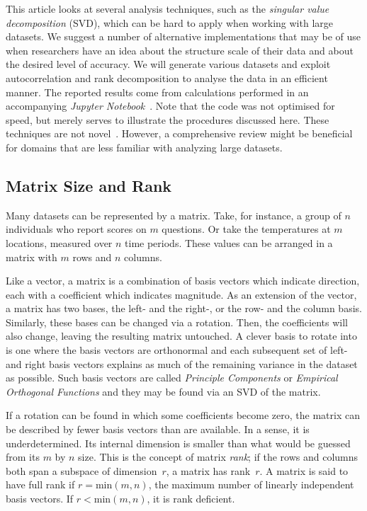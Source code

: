 \documentclass[ijgi,article,submit,moreauthors,pdftex,10pt,a4paper]{Definitions/mdpi}
\begin{document}
This article looks at several analysis techniques, such as the \textit{singular value decomposition} (SVD), which can be hard to apply when working with large datasets. We suggest a number of alternative implementations that may be of use when researchers have an idea about the structure scale of their data and about the desired level of accuracy. We will generate various datasets and exploit autocorrelation and rank decomposition to analyse the data in an efficient manner. The reported results come from calculations performed in an accompanying \textit{Jupyter Notebook}~\cite{Bogaardt2018}. Note that the code was not optimised for speed, but merely serves to illustrate the procedures discussed here. These techniques are not novel~\cite{Golub1970, Bjorck1973, Chan1982}. However, a comprehensive review might be beneficial for domains that are less familiar with analyzing large datasets.

\subsection{Matrix Size and Rank}
\label{sec:Introduction/Matrix Size and Rank}

Many datasets can be represented by a matrix. Take, for instance, a group of $n$ individuals who report scores on $m$ questions. Or take the temperatures at $m$ locations, measured over $n$ time periods. These values can be arranged in a matrix with $m$ rows and $n$ columns.

Like a vector, a matrix is a combination of basis vectors which indicate direction, each with a coefficient which indicates magnitude. As an extension of the vector, a matrix has two bases, the left- and the right-, or the row- and the column basis. Similarly, these bases can be changed via a rotation. Then, the coefficients will also change, leaving the resulting matrix untouched. A clever basis to rotate into is one where the basis vectors are orthonormal and each subsequent set of left- and right basis vectors explains as much of the remaining variance in the dataset as possible. Such basis vectors are called \textit{Principle Components} or \textit{Empirical Orthogonal Functions} and they may be found via an SVD of the matrix.

If a rotation can be found in which some coefficients become zero, the matrix can be described by fewer basis vectors than are available. In a sense, it is underdetermined. Its internal dimension is smaller than what would be guessed from its $m$ by $n$ size. This is the concept of matrix \textit{rank}; if the rows and columns both span a subspace of dimension~$r$, a matrix has rank~$r$. A matrix is said to have full rank if $r = \text{min}(m, n)$, the maximum number of linearly independent basis vectors. If $r < \text{min}(m, n)$, it is rank deficient.
\end{document}
